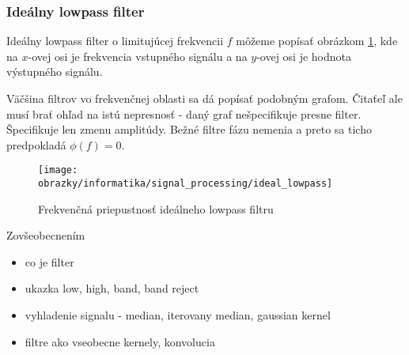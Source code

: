 \subsubsection{Ideálny lowpass filter}
Ideálny lowpass filter o limitujúcej frekvencii $f$ môžeme
popísať obrázkom \ref{fig:ideal_lowpass}, kde na $x$-ovej osi je frekvencia
vstupného signálu a na $y$-ovej osi je hodnota výstupného signálu.
\begin{poznamka}
    Väčšina filtrov vo frekvenčnej oblasti sa dá popísať podobným grafom.
    Čitaťeľ ale musí brať ohľad na istú nepresnosť - daný graf
    nešpecifikuje presne filter. Špecifikuje len zmenu amplitúdy.
    Bežné filtre fázu nemenia a preto sa ticho predpokladá $\phi(f)=0$.
\end{poznamka}

\begin{figure}[htp]
    \centering
    \texttt{[image: obrazky/informatika/signal\_processing/ideal\_lowpass]}
    \caption{Frekvenčná priepustnosť ideálneho lowpass filtru}
    \label{fig:ideal_lowpass}
\end{figure}









Zovšeobecnením 
\begin{itemize}
    \item co je filter
    \item ukazka low, high, band, band reject
    \item vyhladenie signalu - median, iterovany median, gaussian
    kernel
    \item filtre ako vseobecne kernely, konvolucia
\end{itemize}
